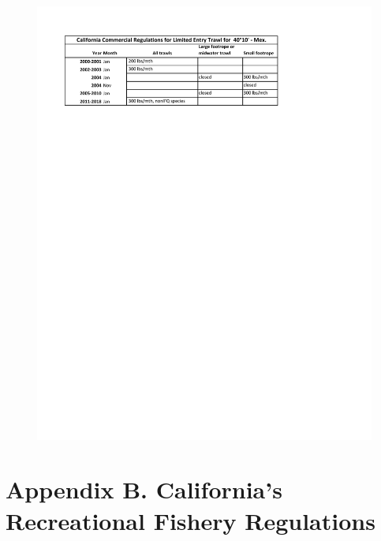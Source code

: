 \documentclass[12pt,]{article}
\begin{document}
\begin{figure}
\centering
\includegraphics{Figures/Comm_regs3.pdf}
\caption{\label{fig:Comm_regs3}}
\end{figure}

\FloatBarrier
\newpage

\hypertarget{appendix-b.-californias-recreational-fishery-regulations}{\section*{Appendix
B. California's Recreational Fishery
Regulations}\label{appendix-b.-californias-recreational-fishery-regulations}}

\renewcommand{\thepage}{B-\arabic{page}}
\renewcommand{\thefigure}{B\arabic{figure}}

\setcounter{page}{1} \setcounter{figure}{1}
\end{document}
